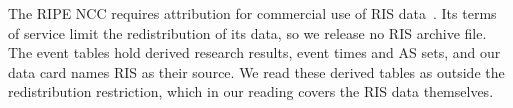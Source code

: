 The RIPE NCC requires attribution for commercial use of RIS data~\cite{ripe_ris}.
Its terms of service limit the redistribution of its data, so we release no RIS archive file.
The event tables hold derived research results, event times and AS sets, and our data card names RIS as their source.
We read these derived tables as outside the redistribution restriction, which in our reading covers the RIS data themselves.

